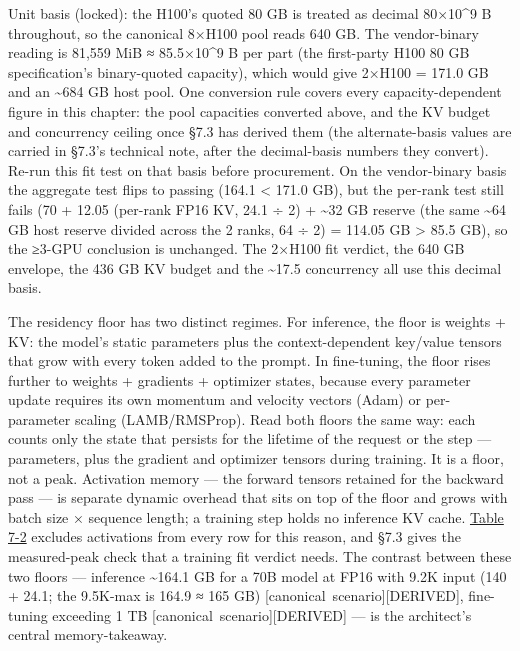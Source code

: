 Unit basis (locked): the H100's quoted 80 GB is treated as decimal
80×10\^{}9 B throughout, so the canonical 8×H100 pool reads 640 GB. The
vendor-binary reading is 81,559 MiB ≈ 85.5×10\^{}9 B per part (the
first-party H100 80 GB specification's binary-quoted capacity), which
would give 2×H100 = 171.0 GB and an \textasciitilde684 GB host pool. One
conversion rule covers every capacity-dependent figure in this chapter:
the pool capacities converted above, and the KV budget and concurrency
ceiling once §7.3 has derived them (the alternate-basis values are
carried in §7.3's technical note, after the decimal-basis numbers they
convert). Re-run this fit test on that basis before procurement. On the
vendor-binary basis the aggregate test flips to passing (164.1
\textless{} 171.0 GB), but the per-rank test still fails (70 + 12.05
(per-rank FP16 KV, 24.1 ÷ 2) + \textasciitilde32 GB reserve (the same
\textasciitilde64 GB host reserve divided across the 2 ranks, 64 ÷ 2) =
114.05 GB \textgreater{} 85.5 GB), so the ≥3-GPU conclusion is
unchanged. The 2×H100 fit verdict, the 640 GB envelope, the 436 GB KV
budget and the \textasciitilde17.5 concurrency all use this decimal
basis.

The residency floor has two distinct regimes. For inference, the floor
is weights + KV: the model's static parameters plus the
context-dependent key/value tensors that grow with every token added to
the prompt. In fine-tuning, the floor rises further to weights +
gradients + optimizer states, because every parameter update requires
its own momentum and velocity vectors (Adam) or per-parameter scaling
(LAMB/RMSProp). Read both floors the same way: each counts only the
state that persists for the lifetime of the request or the step ---
parameters, plus the gradient and optimizer tensors during training. It
is a floor, not a peak. Activation memory --- the forward tensors
retained for the backward pass --- is separate dynamic overhead that
sits on top of the floor and grows with batch size × sequence length; a
training step holds no inference KV cache. \hyperref[tab:7.2]{Table 7-2} excludes
activations from every row for this reason, and §7.3 gives the
measured-peak check that a training fit verdict needs. The contrast
between these two floors --- inference \textasciitilde164.1 GB for a 70B
model at FP16 with 9.2K input (140 + 24.1; the 9.5K-max is 164.9 ≈ 165
GB) \mbox{{[}canonical scenario{]}}\hspace{0pt}\mbox{{[}DERIVED{]}}, fine-tuning exceeding 1 TB
\mbox{{[}canonical scenario{]}}\hspace{0pt}\mbox{{[}DERIVED{]}} --- is the architect's central
memory-takeaway.

